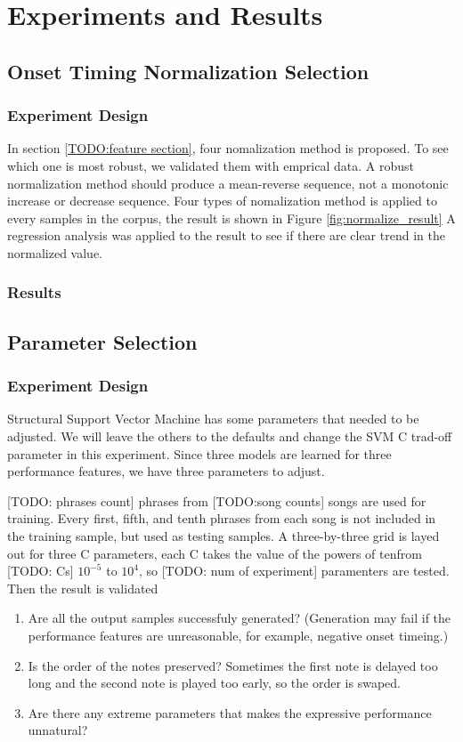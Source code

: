 \chapter{Experiments and Results}
\section{Onset Timing Normalization Selection}
\subsection{Experiment Design}
In section \ref{TODO:feature section}, four nomalization method is proposed. To see which one is most robust, we validated them with emprical data. A robust normalization method should produce a mean-reverse sequence, not a monotonic increase or decrease sequence. Four types of nomalization method is applied to every samples in the corpus, the result is shown in Figure \ref{fig:normalize_result} A regression analysis was applied to the result to see if there are clear trend in the normalized value.
\subsection{Results}

\section{Parameter Selection}
\subsection{Experiment Design}
Structural Support Vector Machine has some parameters that needed to be adjusted. We will leave the others to the defaults and change the SVM C trad-off parameter in this experiment. Since three models are learned for three performance features, we have three parameters to adjust. 

[TODO: phrases count] phrases from [TODO:song counts] songs are used for training. Every first, fifth, and tenth phrases from each song is not included in the training sample, but used as testing samples. A three-by-three grid is layed out for three C parameters, each C takes the value of the powers of tenfrom [TODO: Cs] $10^{-5}$ to $10^4$, so [TODO: num of experiment] paramenters are tested. Then the result is validated
\begin{enumerate}
	\item Are all the output samples successfuly generated? (Generation may fail if the performance features are unreasonable, for example, negative onset timeing.)
	\item Is the order of the notes preserved? Sometimes the first note is delayed too long and the second note is played too early, so the order is swaped.
	\item Are there any extreme parameters that makes the expressive performance unnatural?
\end{enumerate}

